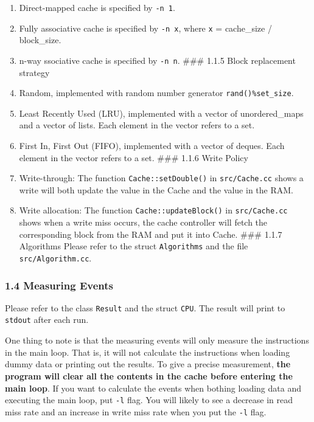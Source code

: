 \documentclass[11pt]{article}
\begin{document}
\begin{enumerate}
\def\labelenumi{(\alph{enumi})}
\item
  Direct-mapped cache is specified by \texttt{-n\ 1}.
\item
  Fully associative cache is specified by \texttt{-n\ x}, where
  \texttt{x} = cache\_size / block\_size.
\item
  n-way ssociative cache is specified by \texttt{-n\ n}. \#\#\# 1.1.5
  Block replacement strategy
\item
  Random, implemented with random number generator
  \texttt{rand()\%set\_size}.
\item
  Least Recently Used (LRU), implemented with a vector of
  unordered\_maps and a vector of lists. Each element in the vector
  refers to a set.
\item
  First In, First Out (FIFO), implemented with a vector of deques. Each
  element in the vector refers to a set. \#\#\# 1.1.6 Write Policy
\item
  Write-through: The function \texttt{Cache::setDouble()} in
  \texttt{src/Cache.cc} shows a write will both update the value in the
  Cache and the value in the RAM.
\item
  Write allocation: The function \texttt{Cache::updateBlock()} in
  \texttt{src/Cache.cc} shows when a write miss occurs, the cache
  controller will fetch the corresponding block from the RAM and put it
  into Cache. \#\#\# 1.1.7 Algorithms Please refer to the struct
  \texttt{Algorithms} and the file \texttt{src/Algorithm.cc}.
\end{enumerate}

\subsubsection{1.4 Measuring Events}\label{measuring-events}

Please refer to the class \texttt{Result} and the struct \texttt{CPU}.
The result will print to \texttt{stdout} after each run.

One thing to note is that the measuring events will only measure the
instructions in the main loop. That is, it will not calculate the
instructions when loading dummy data or printing out the results. To
give a precise measurement, \textbf{the program will clear all the
contents in the cache before entering the main loop}. If you want to
calculate the events when bothing loading data and executing the main
loop, put \texttt{-l} flag. You will likely to see a decrease in read
miss rate and an increase in write miss rate when you put the
\texttt{-l} flag.
\end{document}
